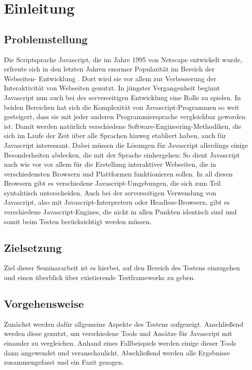 \section{Einleitung}

\subsection{Problemstellung}

Die Scriptsprache Javascript, die im Jahre 1995 von Netscape entwickelt wurde, erfreute sich in den letzten Jahren enormer Popularität im Bereich der Webseiten- Entwicklung \citep[Vgl.][]{Nguyen13}. Dort wird sie vor allem zur Verbesserung der Interaktivität von Webseiten genutzt. In jüngster Vergangenheit beginnt Javascript nun auch bei der serverseitigen Entwicklung eine Rolle zu spielen. In beiden Bereichen hat sich die Komplexität von Javascript-Programmen so weit gesteigert, dass sie mit jeder anderen Programmiersprache vergleichbar geworden ist. Damit werden natürlich verschiedene Software-Engineering-Methodiken, die sich im Laufe der Zeit über alle Sprachen hinweg etabliert haben, auch für Javascript interessant. Dabei müssen die Lösungen für Javascript allerdings einige Besonderheiten abdecken, die mit der Sprache einhergehen: So dient Javascript nach wie vor vor allem für die Erstellung interaktiver Webseiten, die in verschiedensten Browsern und Plattformen funktionieren sollen. In all diesen Browsern gibt es verschiedene Javascript-Umgebungen, die sich zum Teil syntaktisch unterscheiden. Auch bei der serverseitigen Verwendung von Javascript, also mit Javascript-Interpretern oder Headless-Browsern, gibt es verschiedene Javascript-Engines, die nicht in allen Punkten identisch sind und somit beim Testen berücksichtigt werden müssen.

\subsection{Zielsetzung}

Ziel dieser Seminararbeit ist es hierbei, auf den Bereich des Testens einzugehen und einen überblick über existierende Testframeworks zu geben.

\subsection{Vorgehensweise}

Zunächst werden dafür allgemeine Aspekte des Testens aufgezeigt. Anschließend werden diese genutzt, um verschiedene Tools und Ansätze für Javascript mit einander zu vergleichen. Anhand eines Fallbeispiels werden einige dieser Tools dann angewendet und veranschaulicht. Abschließend werden alle Ergebnisse zusammengefasst und ein Fazit gezogen.


